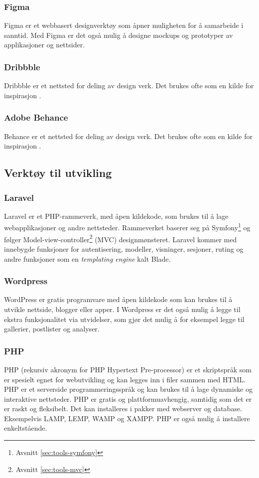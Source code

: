 \subsubsection{Figma}
Figma \cite{figma2019abw} er et webbasert designverktøy som åpner muligheten for å samarbeide i sanntid. Med Figma er det også mulig å designe mockups og prototyper av applikasjoner og nettsider.

\subsubsection{Dribbble}
Dribbble er et nettsted for deling av design verk. Det brukes ofte som en kilde for inspirasjon \cite{Dribbble2019}.

\subsubsection{Adobe Behance}
Behance er et nettsted for deling av design verk. Det brukes ofte som en kilde for inspirasjon \cite{Sloan_wib}.

\subsection{Verktøy til utvikling}

\subsubsection{Laravel}
Laravel \cite{cbcp2019lvw} er et PHP-rammeverk, med åpen kildekode, som brukes til å lage webapplikasjoner og andre nettsteder. Rammeverket baserer seg på Symfony\footnote{Avsnitt \ref{sec:tools-symfony}} og følger Model-view-controller\footnote{Avsnitt \ref{sec:tools-mvc}} (MVC) designmønsteret.
Laravel kommer med innebygde funksjoner for autentisering, modeller, visninger, sesjoner, ruting og andre funksjoner som en \textit{templating engine} kalt Blade.

\subsubsection{Wordpress}
WordPress\cite{wordpress} er gratis programvare med åpen kildekode som kan brukes til å utvikle nettside, blogger eller apper. I Wordpress er det også mulig å legge til ekstra funksjonalitet via utvidelser, som gjør det mulig å for eksempel legge til gallerier, postlister og analyser.

\subsubsection{PHP}
PHP (rekursiv akronym for PHP Hypertext Pre-processor)\cite{McGrath2016pies} er et skriptspråk som er spesielt egnet for webutvikling og kan legges inn i filer sammen med HTML. PHP er et serverside programmeringsspråk og kan brukes til å lage dynamiske og interaktive nettsteder. PHP er gratis og plattformuavhengig, samtidig som det er  er raskt og fleksibelt. Det kan installeres i pakker med webserver og database. Eksempelvis LAMP, LEMP, WAMP og XAMPP. PHP er også mulig å installere enkeltstående. 

